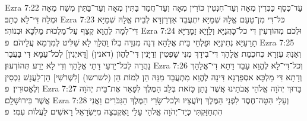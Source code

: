 Ezra 7:22	עַד־כְּסַף כַּכְּרִין מְאָה וְעַד־חִנְטִין כּוֹרִין מְאָה וְעַד־חֲמַר בַּתִּין מְאָה וְעַד־בַּתִּין מְשַׁח מְאָה וּמְלַח דִּי־לָא כְתָב׃
Ezra 7:23	כּל־דִּי מִן־טַעַם אֱלָהּ שְׁמַיָּא יִתְעֲבֵד אַדְרַזְדָּא לְבֵית אֱלָהּ שְׁמַיָּא דִּי־לְמָה לֶהֱוֵא קְצַף עַל־מַלְכוּת מַלְכָּא וּבְנוֹהִי׃
Ezra 7:24	וּלְכֹם מְהוֹדְעִין דִּי כל־כָּהֲנַיָּא וְלֵוָיֵא זַמָּרַיָּא תָרָעַיָּא נְתִינַיָּא וּפָלְחֵי בֵּית אֱלָהָא דְנָה מִנְדָּה בְלוֹ וַהֲלָךְ לָא שַׁלִּיט לְמִרְמֵא עֲלֵיהֹם׃ {פ}
Ezra 7:25	וְאַנְתְּ עֶזְרָא כְּחכְמַת אֱלָהָךְ דִּי־בִידָךְ מֶנִּי שָׁפְטִין וְדַיָּנִין דִּי־לֶהֱוֺן (דאנין) [דָּאיְנִין] לְכל־עַמָּא דִּי בַּעֲבַר נַהֲרָה לְכל־יָדְעֵי דָּתֵי אֱלָהָךְ וְדִי לָא יָדַע תְּהוֹדְעוּן׃
Ezra 7:26	וְכל־דִּי־לָא לֶהֱוֵא עָבֵד דָּתָא דִי־אֱלָהָךְ וְדָתָא דִּי מַלְכָּא אסְפַּרְנָא דִּינָה לֶהֱוֵא מִתְעֲבֵד מִנֵּהּ הֵן לְמוֹת הֵן (לשרשו) [לִשְׁרֹשִׁי] הֵן־לַעֲנָשׁ נִכְסִין וְלֶאֱסוּרִין׃ {פ}
Ezra 7:27	בָּרוּךְ יְהֹוָה אֱלֹהֵי אֲבֹתֵינוּ אֲשֶׁר נָתַן כָּזֹאת בְּלֵב הַמֶּלֶךְ לְפָאֵר אֶת־בֵּית יְהֹוָה אֲשֶׁר בִּירוּשָׁלָ͏ִם׃
Ezra 7:28	וְעָלַי הִטָּה־חֶסֶד לִפְנֵי הַמֶּלֶךְ וְיוֹעֲצָיו וּלְכל־שָׂרֵי הַמֶּלֶךְ הַגִּבֹּרִים וַאֲנִי הִתְחַזַּקְתִּי כְּיַד־יְהֹוָה אֱלֹהַי עָלַי וָאֶקְבְּצָה מִיִּשְׂרָאֵל רָאשִׁים לַעֲלוֹת עִמִּי׃ {פ}
